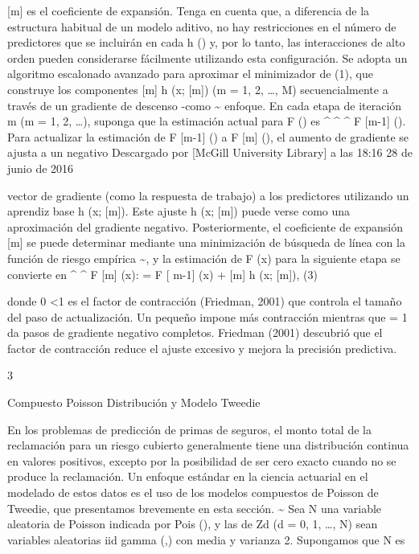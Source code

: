 \documentclass[]{article}
\begin{document}
 {[}m{]} es el coeficiente de expansión. Tenga en cuenta que, a
diferencia de la estructura habitual de un modelo aditivo, no hay
restricciones en el número de predictores que se incluirán en cada h ()
y, por lo tanto, las interacciones de alto orden pueden considerarse
fácilmente utilizando esta configuración. Se adopta un algoritmo
escalonado avanzado para aproximar el minimizador de (1), que construye
los componentes {[}m{]} h (x; {[}m{]}) (m = 1, 2, \ldots{}, M)
secuencialmente a través de un gradiente de descenso -como
\textasciitilde{} enfoque. En cada etapa de iteración m (m = 1, 2,
\ldots{}), suponga que la estimación actual para F () es \^{} \^{} \^{}
F {[}m-1{]} (). Para actualizar la estimación de F {[}m-1{]} () a F
{[}m{]} (), el aumento de gradiente se ajusta a un negativo Descargado
por {[}McGill University Library{]} a las 18:16 28 de junio de 2016

vector de gradiente (como la respuesta de trabajo) a los predictores
utilizando un aprendiz base h (x; {[}m{]}). Este ajuste h (x; {[}m{]})
puede verse como una aproximación del gradiente negativo.
Posteriormente, el coeficiente de expansión {[}m{]} se puede determinar
mediante una minimización de búsqueda de línea con la función de riesgo
empírica \textasciitilde{}, y la estimación de F (x) para la siguiente
etapa se convierte en \^{} \^{} F {[}m{]} (x): = F {[} m-1{]} (x) +
{[}m{]} h (x; {[}m{]}), (3)

donde 0 \textless{}1 es el factor de contracción (Friedman, 2001) que
controla el tamaño del paso de actualización. Un pequeño impone más
contracción mientras que = 1 da pasos de gradiente negativo completos.
Friedman (2001) descubrió que el factor de contracción reduce el ajuste
excesivo y mejora la precisión predictiva.

3

Compuesto Poisson Distribución y Modelo Tweedie

En los problemas de predicción de primas de seguros, el monto total de
la reclamación para un riesgo cubierto generalmente tiene una
distribución continua en valores positivos, excepto por la posibilidad
de ser cero exacto cuando no se produce la reclamación. Un enfoque
estándar en la ciencia actuarial en el modelado de estos datos es el uso
de los modelos compuestos de Poisson de Tweedie, que presentamos
brevemente en esta sección. \textasciitilde{} Sea N una variable
aleatoria de Poisson indicada por Pois (), y las de Zd (d = 0, 1,
\ldots{}, N) sean variables aleatorias iid gamma (,) con media y
varianza 2. Supongamos que N es
\end{document}
